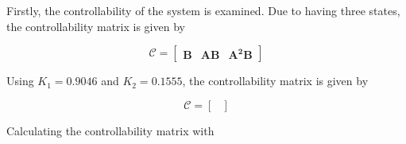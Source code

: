 Firstly, the controllability of the system is examined. Due to having three states, the controllability matrix is given by

\begin{equation}\label{eq:P3_p2_controllability_matrix}
    \mathcal{C}=
        \begin{bmatrix}
            \mathbf{B}&\mathbf{AB}&\mathbf{A^2B}
        \end{bmatrix}
\end{equation}

Using $K_1=0.9046$ and $K_2=0.1555$, the controllability matrix is given by

\begin{equation}
    \mathcal{C}=
        \begin{bmatrix}
            
        \end{bmatrix}
\end{equation}

Calculating the controllability matrix with 

